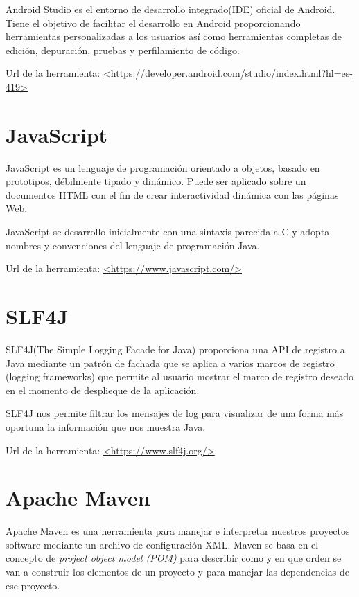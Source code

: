 Android Studio es el entorno de desarrollo integrado(IDE) oficial de Android. Tiene el objetivo de facilitar el desarrollo en Android proporcionando herramientas personalizadas a los usuarios así como herramientas completas de edición, depuración, pruebas y perfilamiento de código.

Url de la herramienta: \url{<https://developer.android.com/studio/index.html?hl=es-419>}

\section{JavaScript}

JavaScript es un lenguaje de programación orientado a objetos, basado en prototipos, débilmente tipado y dinámico. Puede ser aplicado sobre un documentos HTML con el fin de crear interactividad dinámica con las páginas Web.

JavaScript se desarrollo inicialmente con una sintaxis parecida a C y adopta nombres y convenciones del lenguaje de programación Java.\cite{wiki:javascript}

Url de la herramienta: \url{<https://www.javascript.com/>}

\section{SLF4J}

SLF4J(The Simple Logging Facade for Java) proporciona una API de registro a Java mediante un patrón de fachada que se aplica a varios marcos de registro (logging frameworks) que permite al usuario mostrar el marco de registro deseado en el momento de desplieque de la aplicación.

SLF4J nos permite filtrar los mensajes de log para visualizar de una forma más oportuna la información que nos muestra Java.

Url de la herramienta: \url{<https://www.slf4j.org/>}

\section{Apache Maven}

Apache Maven es una herramienta para manejar e interpretar nuestros proyectos software mediante un archivo de configuración XML. Maven se basa en el concepto de \textit{project object model (POM)} para describir como y en que orden se van a construir los elementos de un proyecto y para manejar las dependencias de ese proyecto.

